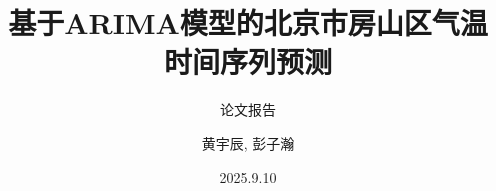 \documentclass{beamer}
\title{基于ARIMA模型的北京市房山区气温时间序列预测}
\subtitle{论文报告}
\author{{黄宇辰, 彭子瀚}}
\date{2025.9.10}
\begin{document}
\maketitle


\QApage
\end{document}
